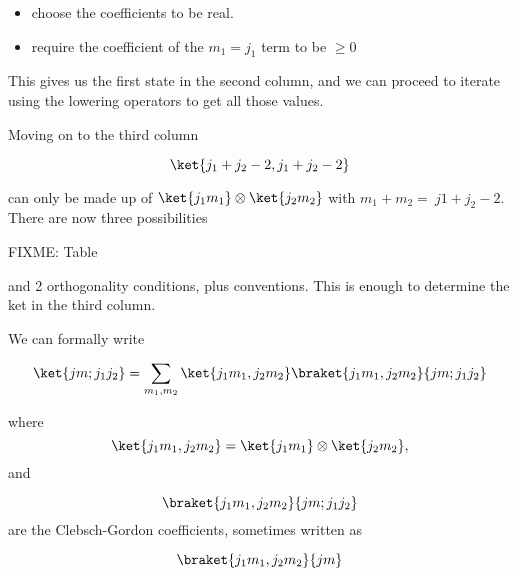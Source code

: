 \begin{itemize}
\item choose the coefficients to be real.
\item require the coefficient of the $m_1 = j_1$ term to be $\ge 0$
\end{itemize}

This gives us the first state in the second column, and we can proceed to iterate using the lowering operators to get all those values.

Moving on to the third column

\begin{equation}\label{eqn:qmTwoL18:n}
\ket{j_1 + j_2 - 2, j_1 + j_2 -2} 
\end{equation}

can only be made up of $\ket{j_1 m_1} \otimes \ket{j_2 m_2}$ with $m_1 + m_2 = \
j1 + j_2 -2$.  There are now three possibilities

FIXME: Table

and 2 orthogonality conditions, plus conventions.  This is enough to determine the ket in the third column.

We can formally write

\begin{equation}\label{eqn:qmTwoL18:n}
\ket{jm ; j_1 j_2} = 
\sum_{m_1, m_2}
\ket{ j_1 m_1, j_2 m_2}
\braket{ j_1 m_1, j_2 m_2}{jm ; j_1 j_2} 
\end{equation}

where
\begin{equation}\label{eqn:qmTwoL18:n}
\ket{ j_1 m_1, j_2 m_2} = \ket{j_1 m_1} \otimes \ket{j_2 m_2},
\end{equation}
and

\begin{equation}\label{eqn:qmTwoL18:n}
\braket{ j_1 m_1, j_2 m_2}{jm ; j_1 j_2} 
\end{equation}
are the Clebsch-Gordon coefficients, sometimes written as 

\begin{equation}\label{eqn:qmTwoL18:n}
\braket{ j_1 m_1, j_2 m_2 }{ jm }
\end{equation}

